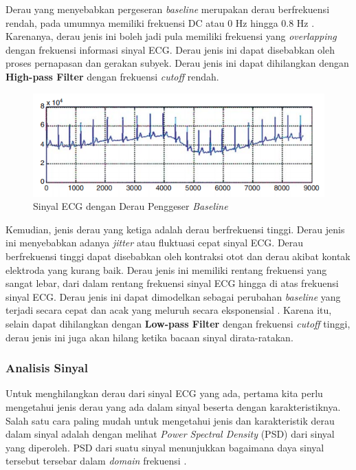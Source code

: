 \documentclass[11pt]{article}
\begin{document}
Derau yang menyebabkan pergeseran \textit{baseline} merupakan derau berfrekuensi rendah, pada umumnya memiliki frekuensi DC atau 0 Hz hingga 0.8 Hz \cite{archarya14}. Karenanya, derau jenis ini boleh jadi pula memiliki frekuensi yang \textit{overlapping} dengan frekuensi informasi sinyal ECG. Derau jenis ini dapat disebabkan oleh proses pernapasan dan gerakan subyek. Derau jenis ini dapat dihilangkan dengan \textbf{High-pass Filter} dengan frekuensi \textit{cutoff} rendah.

\begin{figure}[H]
\centerline{\includegraphics[scale=0.4]{figures/fig3-baselinewander.png}}
\caption{Sinyal ECG dengan Derau Penggeser \textit{Baseline} \cite{thakor84}}
\end{figure}

Kemudian, jenis derau yang ketiga adalah derau berfrekuensi tinggi. Derau jenis ini menyebabkan adanya \textit{jitter} atau fluktuasi cepat sinyal ECG. Derau berfrekuensi tinggi dapat disebabkan oleh kontraksi otot dan derau akibat kontak elektroda yang kurang baik. Derau jenis ini memiliki rentang frekuensi yang sangat lebar, dari dalam rentang frekuensi sinyal ECG hingga di atas frekuensi sinyal ECG. Derau jenis ini dapat dimodelkan sebagai perubahan \textit{baseline} yang terjadi secara cepat dan acak yang meluruh secara eksponensial \cite{archarya14}. Karena itu, selain dapat dihilangkan dengan \textbf{Low-pass Filter} dengan frekuensi \textit{cutoff} tinggi, derau jenis ini juga akan hilang ketika bacaan sinyal dirata-ratakan.

\subsubsection{Analisis Sinyal}
Untuk menghilangkan derau dari sinyal ECG yang ada, pertama kita perlu mengetahui jenis derau yang ada dalam sinyal beserta dengan karakteristiknya. Salah satu cara paling mudah untuk mengetahui jenis dan karakteristik derau dalam sinyal adalah dengan melihat \textit{Power Spectral Density} (PSD) dari sinyal yang diperoleh. PSD dari suatu sinyal menunjukkan bagaimana daya sinyal tersebut tersebar dalam \textit{domain} frekuensi \cite{oppenheim}.
\end{document}
